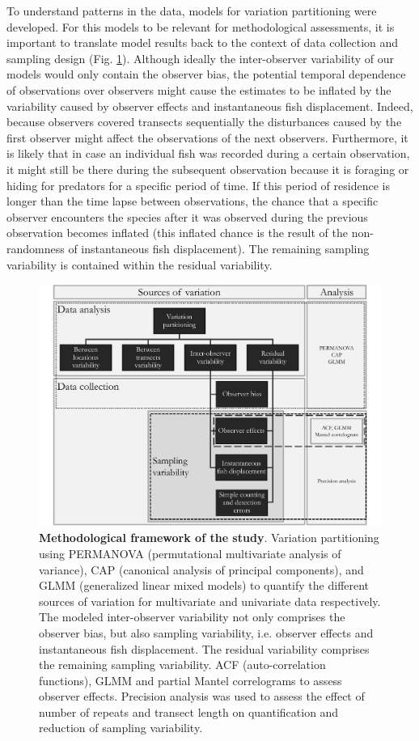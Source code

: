 \documentclass[10pt,letterpaper]{article}
\begin{document}
To understand patterns in the data, models for variation partitioning were developed. For this models to be relevant for methodological assessments, it is important to translate model results back to the context of data collection and sampling design (Fig. \ref{fig:Variability_framework}). Although ideally the inter-observer variability of our models would only contain the observer bias, the potential temporal dependence of observations over observers might cause the estimates to be inflated by the variability caused by observer effects and instantaneous fish displacement. Indeed, because observers covered transects sequentially the disturbances caused by the first observer might affect the observations of the next observers. Furthermore, it is likely that in case an individual fish was recorded during a certain observation, it might still be there during the subsequent observation because it is foraging or hiding for predators for a specific period of time. If this period of residence is longer than the time lapse between observations, the chance that a specific observer encounters the species after it was observed during the previous observation becomes inflated (this inflated chance is the result of the non-randomness of instantaneous fish displacement). The remaining sampling variability is contained within the residual variability. 

\begin{figure}[h!]
  \centering\includegraphics[scale=0.42]{Variability_framework4}
  \caption{{\bf Methodological framework of the study}. Variation partitioning using PERMANOVA (permutational multivariate analysis of variance), CAP (canonical analysis of principal components), and GLMM (generalized linear mixed models) to quantify the different sources of variation for multivariate and univariate data respectively. The modeled inter-observer variability not only comprises the observer bias, but also sampling variability, i.e. observer effects and instantaneous fish displacement. The residual variability comprises the remaining sampling variability. ACF (auto-correlation functions), GLMM and partial Mantel correlograms to assess observer effects. Precision analysis was used to assess the effect of number of repeats and transect length on quantification and reduction of sampling variability.} 
  \label{fig:Variability_framework}
\end{figure}
\end{document}
